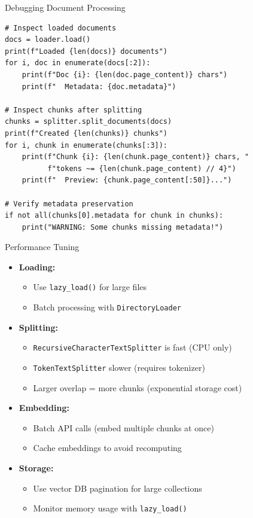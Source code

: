 \documentclass[aspectratio=169,11pt]{beamer}
\begin{document}
\begin{frame}[fragile]{Debugging Document Processing}
  \small
  \begin{lstlisting}
# Inspect loaded documents
docs = loader.load()
print(f"Loaded {len(docs)} documents")
for i, doc in enumerate(docs[:2]):
    print(f"Doc {i}: {len(doc.page_content)} chars")
    print(f"  Metadata: {doc.metadata}")

# Inspect chunks after splitting
chunks = splitter.split_documents(docs)
print(f"Created {len(chunks)} chunks")
for i, chunk in enumerate(chunks[:3]):
    print(f"Chunk {i}: {len(chunk.page_content)} chars, "
          f"tokens ~= {len(chunk.page_content) // 4}")
    print(f"  Preview: {chunk.page_content[:50]}...")

# Verify metadata preservation
if not all(chunks[0].metadata for chunk in chunks):
    print("WARNING: Some chunks missing metadata!")
  \end{lstlisting}
\end{frame}

\begin{frame}{Performance Tuning}
  \begin{itemize}
    \setlength{\itemsep}{1pt}
    \item \textbf{Loading:}
    \begin{itemize}
    \setlength{\itemsep}{1pt}
      \item Use \texttt{lazy\_load()} for large files
      \item Batch processing with \texttt{DirectoryLoader}
    \end{itemize}

    \item \textbf{Splitting:}
    \begin{itemize}
    \setlength{\itemsep}{1pt}
      \item \texttt{RecursiveCharacterTextSplitter} is fast (CPU only)
      \item \texttt{TokenTextSplitter} slower (requires tokenizer)
      \item Larger overlap = more chunks (exponential storage cost)
    \end{itemize}

    \item \textbf{Embedding:}
    \begin{itemize}
    \setlength{\itemsep}{1pt}
      \item Batch API calls (embed multiple chunks at once)
      \item Cache embeddings to avoid recomputing
    \end{itemize}

    \item \textbf{Storage:}
    \begin{itemize}
    \setlength{\itemsep}{1pt}
      \item Use vector DB pagination for large collections
      \item Monitor memory usage with \texttt{lazy\_load()}
    \end{itemize}
  \end{itemize}
\end{frame}
\end{document}
